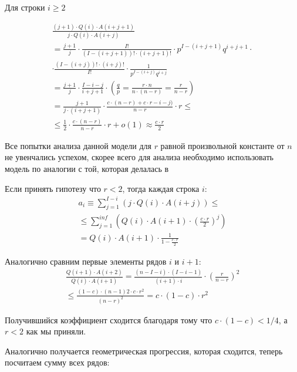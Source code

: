 \documentclass[times]{itmo-student-thesis}
\begin{document}
    Для строки $i \geq 2$

    \begin{gather*}
        \frac{(j + 1)\cdot Q(i)\cdot A(i + j + 1)}{j\cdot Q(i) \cdot A(i + j)} \\
        = \frac{j + 1}{j} \cdot \frac{I!}{(I - (i + j + 1))! \cdot (i + j + 1)!} \cdot p^{I - (i + j + 1)} q^{i + j + 1} \cdot\\
        \cdot \frac{(I - (i + j))! \cdot (i + j)!} {I!} \cdot \frac{1}{p^{I - (i + j)} q^{i + j}} \\
        = \frac{j + 1}{j} \cdot \frac{I - i - j}{i + j + 1} \cdot (\frac{q}{p} = \frac{r \cdot n}{n \cdot (n - r)} = \frac{r}{n - r}) \\
        =  \frac{j + 1}{j \cdot (i + j + 1)} \cdot  \frac{c\cdot (n - r) + c\cdot r - i - j)}{n - r} \cdot r \leq \\
        \leq \frac{1}{2} \cdot \frac{c\cdot (n - r)}{n - r} \cdot r + o(1) \approx \frac{c \cdot r}{2}
    \end{gather*}

    Все попытки анализа данной модели для $r$ равной произвольной константе от $n$ не увенчались успехом, скорее всего для анализа необходимо использовать модель по аналогии с той, которая делалась в \cite{markov_chain}

    Если принять гипотезу что $r < 2$, тогда каждая строка $i$:
    \begin{gather*}
        a_i \equiv \sum_{j = 1}^{I - i} (j \cdot Q(i) \cdot A(i + j)) \leq \\
        \leq \sum_{j = 1}^{inf} (Q(i) \cdot A(i + 1) \cdot (\frac{c \cdot r}{2})^{j}) \\
        = Q(i) \cdot A(i + 1) \cdot \frac{1}{1 - \frac{c \cdot r}{2}}
    \end{gather*}

    Аналогично сравним первые элементы рядов $i$ и $i + 1$:
    \begin{gather*}
        \frac{Q(i + 1) \cdot A(i + 2)}{Q(i) \cdot A(i + 1)} = \frac{(n - I - i) \cdot (I - i - 1)}{(i + 1) \cdot i} \cdot (\frac{r}{n - r})^2 \\
        \leq \frac{(1 - c) \cdot (n - 1)2 \cdot c \cdot r^2}{(n - r)^2} = c \cdot (1 - c) \cdot r^2
    \end{gather*}

    Получившийся коэффициент сходится благодаря тому что $c \cdot (1 - c) < 1/4$, а $r < 2$ как мы приняли.

    Аналогично получается геометрическая прогрессия, которая сходится, теперь посчитаем сумму всех рядов:
\end{document}
